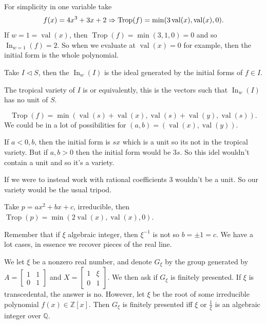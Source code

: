 \documentclass[12pt]{memoir}
\DeclareMathOperator{\val}{val}
\DeclareMathOperator{\Trop}{Trop}
\theoremstyle{definition}
\def\ZZ{{\mathbb Z}}
\def\QQ{{\mathbb Q}}
\begin{document}
\begin{Ex}
    For simplicity in one variable take 
    $$f(x)=4x^3+3x+2\To\Trop(f)=\min(3\val(x),\val(x),0).$$
    If $w=1=\val(x)$, then $\Trop(f)=\min(3,1,0)=0$ and so $\operatorname*{In}_{w=1}(f)=2$. So when we evaluate at $\val(x)=0$ for example, then the initial form is the whole polynomial.
\end{Ex}

\begin{Def}
    Take $I\triangleleft S$, then the  $\operatorname{In}_w(I)$ is the ideal generated by the initial forms of $f\in I$.
\end{Def}

\begin{Def}
    The tropical variety of $I$ is 
    or equivalently, this is the vectors such that $\operatorname{In}_w(I)$ has no unit of $S$.
\end{Def}

\begin{Ex}
    $$\Trop(f)=\min(\val(s)+\val(x),\val(s)+\val(y),\val(s)).$$
    We could be in a lot of possibilities for $(a,b)=(\val(x),\val(y))$.\par 
    If $a<0,b$, then the initial form is $sx$ which is a unit so its not in the tropical variety. But if $a,b>0$ then the initial form would be $3s$. So this idel wouldn't contain a unit and so it's a variety. \par 
    If we were to instead work with rational coefficients $3$ wouldn't be a unit. So our variety would be the usual tripod.
\end{Ex}

\begin{Ex}
    Take $p=ax^2+bx+c$, irreducible, then $\Trop(p)=\min(2\val(x),\val(x),0)$.
\end{Ex}

Remember that if $\xi$ algebraic integer, then $\xi^{-1}$ is not so $b=\pm 1=c$. We have a lot cases, in essence we recover pieces of the real line.



We let $\xi$ be a nonzero real number, and denote $G_\xi$ by the group generated by $A = \begin{bmatrix}
    1 & 1 \\ 0 & 1
\end{bmatrix}$ and $X = \begin{bmatrix}
    1 & \xi \\ 0 & 1
\end{bmatrix}$. We then ask if $G_\xi$ is finitely presented. If $\xi$ is transcedental, the answer is no. However, let $\xi$ be the root of some irreducible polynomial $f(x)\in \ZZ[x]$. Then $G_\xi$ is finitely presented iff $\xi$ or $\frac{1}{\xi}$ is an algebraic integer over $\QQ$.
\end{document}
